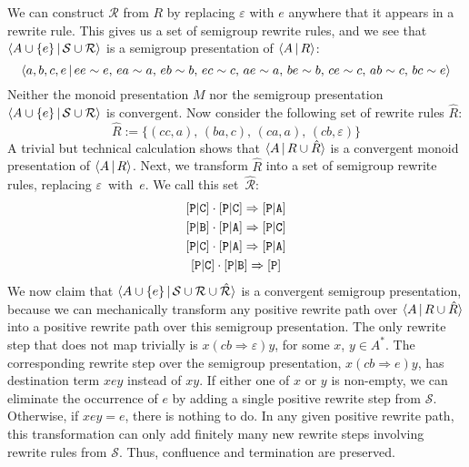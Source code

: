 \documentclass[../generics]{subfiles}
\begin{document}
\begin{example}
We can construct $\mathcal{R}$ from $R$ by replacing $\varepsilon$ with $e$ anywhere that it appears in a rewrite rule. This gives us a set of semigroup rewrite rules, and we see that $\langle A\cup\{e\}\,|\, \mathcal{S}\cup\mathcal{R}\rangle$ is a semigroup presentation of $\langle A\,|\,R\rangle$:
\[\langle a,b,c,e\,|\,ee\sim e,\,ea\sim a,\,eb\sim b,\,ec\sim c,\,ae\sim a,\,be\sim b,\,ce\sim c,\,ab\sim c,\,bc\sim e\rangle\]
Neither the monoid presentation $M$ nor the semigroup presentation $\langle A\cup\{e\}\,|\,\mathcal{S}\cup\mathcal{R}\rangle$ is convergent. Now consider the following set of rewrite rules $\hat{R}$:
\[\hat{R} := \{(cc,a),\,(ba,c),\,(ca,a),\,(cb,\varepsilon)\}\]
A trivial but technical calculation shows that $\langle A\,|\,R\cup\hat{R}\rangle$ is a convergent monoid presentation of $\langle A\,|\,R\rangle$. Next, we transform $\hat{R}$ into a set of semigroup rewrite rules, replacing $\varepsilon$~with~$e$. We call this set~$\hat{\mathcal{R}}$:
\begin{gather*}
\aPC\cdot\aPC\Rightarrow\aPA\\
\aPB\cdot\aPA\Rightarrow\aPC\\
\aPC\cdot\aPA\Rightarrow\aPA\\
\aPC\cdot\aPB\Rightarrow\pP
\end{gather*}
We now claim that $\langle A\cup\{e\}\,|\,\mathcal{S}\cup\mathcal{R}\cup\hat{\mathcal{R}}\rangle$ is a convergent semigroup presentation, because we can mechanically transform any positive rewrite path over $\langle A\,|\,R\cup\hat{R}\rangle$ into a positive rewrite path over this semigroup presentation. The only rewrite step that does not map trivially is $x(cb\Rightarrow\varepsilon)y$, for some $x$, $y\in A^*$. The corresponding rewrite step over the semigroup presentation, $x(cb\Rightarrow e)y$, has destination term $xey$ instead of $xy$. If either one of $x$ or $y$ is non-empty, we can eliminate the occurrence of $e$ by adding a single positive rewrite step from $\mathcal{S}$. Otherwise, if $xey=e$, there is nothing to do. In any given positive rewrite path, this transformation can only add finitely many new rewrite steps involving rewrite rules from $\mathcal{S}$. Thus, confluence and termination are preserved.


\end{example}
\end{document}
